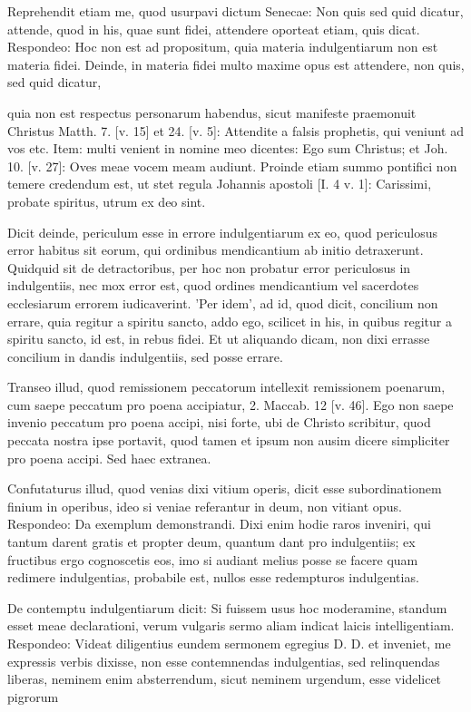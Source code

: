 Reprehendit etiam me, quod usurpavi dictum Senecae: Non quis sed quid dicatur, attende, quod in his, quae sunt fidei, attendere oporteat etiam, quis dicat. Respondeo: Hoc non est ad propositum, quia materia indulgentiarum non est materia fidei. Deinde, in materia fidei multo maxime opus est attendere, non quis, sed quid dicatur,

quia non est respectus personarum habendus, sicut manifeste praemonuit Christus Matth. 7. [v. 15] et 24. [v. 5]: Attendite a falsis prophetis, qui veniunt ad vos etc. Item: multi venient in nomine meo dicentes: Ego sum \marginpar{\small[355]} Christus; et Joh. 10. [v. 27]: Oves meae vocem meam audiunt. Proinde etiam summo pontifici non temere credendum est, ut stet regula Johannis apostoli [I. 4 v. 1]: Carissimi, probate spiritus, utrum ex deo sint.

Dicit deinde, periculum esse in errore indulgentiarum ex eo, quod periculosus error habitus sit eorum, qui ordinibus mendicantium ab initio detraxerunt. Quidquid sit de detractoribus, per hoc non probatur error periculosus in indulgentiis, nec mox error est, quod ordines mendicantium vel sacerdotes ecclesiarum errorem iudicaverint. 'Per idem', ad id, quod dicit, concilium non errare, quia regitur a spiritu sancto, addo ego, scilicet in his, in quibus regitur a spiritu sancto, id est, in rebus fidei. Et ut aliquando dicam, non dixi errasse concilium in dandis indulgentiis, sed posse errare.

Transeo illud, quod remissionem peccatorum intellexit remissionem poenarum, cum saepe peccatum pro poena accipiatur, 2. Maccab. 12 [v. 46]. Ego non saepe invenio peccatum pro poena accipi, nisi forte, ubi de Christo scribitur, quod peccata nostra ipse portavit, quod tamen et ipsum non ausim dicere simpliciter pro poena accipi. Sed haec extranea.

Confutaturus illud, quod venias dixi vitium operis, dicit esse subordinationem finium in operibus, ideo si veniae referantur in deum, non vitiant opus. Respondeo: Da exemplum demonstrandi. Dixi enim hodie raros inveniri, qui tantum darent gratis et propter deum, quantum dant pro indulgentiis; ex fructibus ergo cognoscetis eos, imo si audiant melius posse se facere quam redimere indulgentias, probabile est, nullos esse redempturos indulgentias.

De contemptu indulgentiarum dicit: Si fuissem usus hoc moderamine, standum esset meae declarationi, verum vulgaris sermo aliam indicat laicis intelligentiam. Respondeo: Videat diligentius eundem sermonem egregius D. D. et inveniet, me expressis verbis dixisse, non esse contemnendas indulgentias, sed relinquendas liberas, neminem enim absterrendum, sicut neminem urgendum, esse videlicet pigrorum

